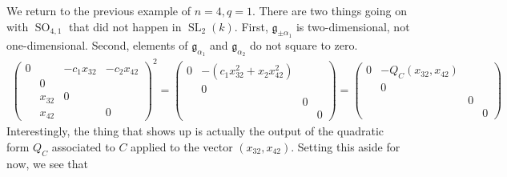 \documentclass[12pt]{article}
\theoremstyle{definition}
\newcommand{\lp}{\left(}
\newcommand{\rp}{\right)}
\newcommand{\noi}{\noindent}
\newcommand{\frakg}{\mathfrak{g}}
\DeclareMathOperator{\SL}{SL}
\DeclareMathOperator{\SO}{SO}
\begin{document}
\noi We return to the previous example of $n=4, q=1$. There are two things going on with $\SO_{4,1}$ that did not happen in $\SL_2(k)$. First, $\frakg_{\pm \alpha_1}$ is two-dimensional, not one-dimensional. Second, elements of $\frakg_{\alpha_1}$ and $\frakg_{\alpha_2}$ do not square to zero.
\begin{align*}
	\begin{pmatrix}
		0 && - c_1 x_{32}  & - c_2 x_{42} \\
		& 0 &  \\
		& x_{32} & 0 &  \\
		& x_{42} && 0
	\end{pmatrix}^2 =
	\begin{pmatrix}
		0 & - \lp c_1 x_{32}^2 + x_2 x_{42}^2 \rp  &  &  \\ 
		 & 0 &  &  \\
		 &  & 0 &  \\
		 &  &  & 0
	\end{pmatrix}=
	\begin{pmatrix}
		0 & -  Q_C \lp x_{32}, x_{42} \rp  &  &  \\ 
		 & 0 &  &  \\
		 &  & 0 &  \\
		 &  &  & 0
	\end{pmatrix}
\end{align*}
Interestingly, the thing that shows up is actually the output of the quadratic form $Q_C$ associated to $C$ applied to the vector $(x_{32}, x_{42})$. Setting this aside for now, we see that
\end{document}
